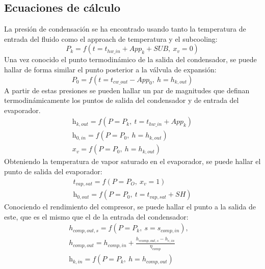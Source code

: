 \documentclass[../main.tex]{subfiles}
\begin{document}
\newpage


\subsection{Ecuaciones de cálculo}
La presión de condensación se ha encontrado usando tanto la temperatura de entrada del fluido como el approach de temperatura y el subcooling:
\begin{equation}
P_{k} = f(t = t_{hw\_in} + App_{k} + SUB,\ x_{v} = 0)
\end{equation}
Una vez conocido el punto termodinámico de la salida del condensador, se puede hallar de forma similar el punto posterior a la válvula de expansión:
\begin{equation}
P_{0} = f(t = t_{cw\_out} - App_{0},\ h = h_{k,out})
\end{equation}
A partir de estas presiones se pueden hallar un par de magnitudes que definan termodinámicamente los puntos de salida del condensador y de entrada del evaporador.
\begin{gather}
\mathrm{h}_{k,out} = f(P = P_{k},\ t = t_{hw\_in} + App_{k})
\label{eq:punto_k,out}
\\
\mathrm{h}_{0,in} = f(P = P_{0},\ h = h_{k,out})
\\
x_{v} = f(P = P_{0},\ h = h_{k,out})
\label{eq:punto_O,in}
\end{gather}
Obteniendo la temperatura de vapor saturado en el evaporador, se puede hallar el punto de salida del evaporador:
\begin{gather}
t_{vap,sat} = f(P = P_{O},\ x_{v} = 1)
\label{eq:t_vap_sat}
\\
\mathrm{h}_{0,out} = f(P = P_{0},\ t = t_{vap,sat} + SH)
\label{eq:punto_O,out}
\end{gather}
Conociendo el rendimiento del compresor, se puede hallar el punto a la salida de este, que es el mismo que el de la entrada del condensador:
\begin{gather}
h_{comp,out,s} = f(P = P_{k},\ s = s_{comp,in}),\quad
\label{eq:h_c,out,s}
\\
h_{comp,out} = h_{comp,in} + \frac{h_{ccomp,out,s} - h_{c,in}}{\eta_{comp}}
\label{eq:h_c,out}
\\
\mathrm{h}_{k,in} = f(P = P_{k},\ h = h_{comp,out})
\label{eq:punto_k,in}
\end{gather}
\end{document}
